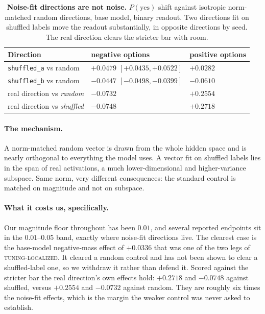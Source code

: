 \documentclass{article}
\begin{document}
\begin{table}[t]
\centering
\small
\caption{\textbf{Noise-fit directions are not noise.} $P(\mathrm{yes})$ shift against isotropic
norm-matched random directions, base model, binary readout. Two directions fit on shuffled labels
move the readout substantially, in opposite directions by seed. The real direction clears the
stricter bar with room.}
\label{tab:shuffled}
\begin{tabular}{@{}lll@{}}
\toprule
\textbf{Direction} & \textbf{negative options} & \textbf{positive options} \\
\midrule
\texttt{shuffled\_a} vs random & $+0.0479$ $[+0.0435, +0.0522]$ & $+0.0282$ \\
\texttt{shuffled\_b} vs random & $-0.0447$ $[-0.0498, -0.0399]$ & $-0.0610$ \\
\midrule
real direction vs \emph{random}   & $-0.0732$ & $+0.2554$ \\
real direction vs \emph{shuffled} & $-0.0748$ & $+0.2718$ \\
\bottomrule
\end{tabular}
\end{table}

\paragraph{The mechanism.} A norm-matched random vector is drawn from the whole hidden space and is
nearly orthogonal to everything the model uses. A vector fit on shuffled labels lies in the span of
real activations, a much lower-dimensional and higher-variance subspace. Same norm, very different
consequences: the standard control is matched on magnitude and not on subspace.

\paragraph{What it costs us, specifically.} Our magnitude floor throughout has been $0.01$, and
several reported endpoints sit in the $0.01$--$0.05$ band, exactly where noise-fit directions live.
The clearest case is the base-model negative-mass effect of $+0.0336$ that was one of the two legs
of \textsc{tuning-localized}. It cleared a random control and has not been shown to clear a
shuffled-label one, so we withdraw it rather than defend it. Scored against the stricter bar the
real direction's own effects hold: $+0.2718$ and $-0.0748$ against shuffled, versus $+0.2554$ and
$-0.0732$ against random. They are roughly six times the noise-fit effects, which is the margin the
weaker control was never asked to establish.
\end{document}
